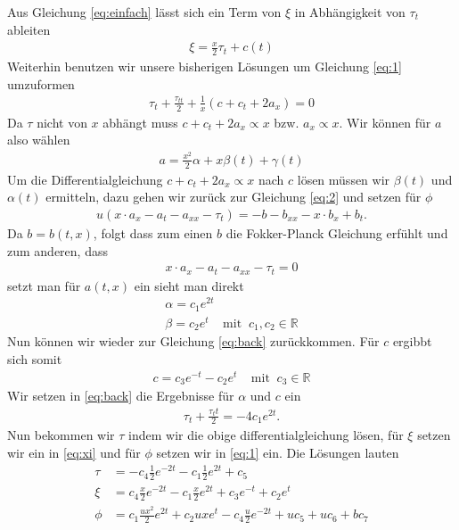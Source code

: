 \documentclass[a4paper]{article}
\begin{document}
Aus Gleichung \ref{eq:einfach} lässt sich ein Term von $\xi$ in Abhängigkeit
von $\tau_t$ ableiten
\begin{align}
    \xi = \frac{x}{2} \tau_t + c(t) \label{eq:xi}
\end{align}
Weiterhin benutzen wir unsere bisherigen Lösungen um Gleichung \ref{eq:1}
umzuformen
\begin{align}
    \tau_t +\frac{\tau_{tt}}{2} + \frac{1}{x}(c +c_t + 2a_x) = 0\label{eq:back}
\end{align}
Da $\tau$ nicht von $x$ abhängt muss $c + c_t + 2a_x \propto x$ bzw. $a_x
\propto x$. Wir können für $a$ also wählen
\begin{align}
    a = \frac{x^2}{2}\alpha+x\beta(t)+\gamma(t)
\end{align}
Um die Differentialgleichung $c+c_t+2a_x \propto x$ nach $c$ lösen müssen wir
$\beta(t)$ und $\alpha(t)$ ermitteln, dazu gehen wir zurück zur Gleichung
\ref{eq:2} und setzen für $\phi$
\begin{align}
    u( x\cdot a_x -  a_t - a_{xx} -\tau_t) = -b -b_{xx}
    -x\cdot b_{x} + b_t.
\end{align}
Da $b = b(t,x)$, folgt dass zum einen $b$ die Fokker-Planck Gleichung erfühlt
und zum anderen, dass
\begin{align}
    x\cdot a_x - a_t -a_{xx} -\tau_t = 0
\end{align}
setzt man für $a(t,x)$ ein sieht man direkt
\begin{align}
    \alpha = c_1 e^{2t}\\
    \beta = c_2 e^t \;\;\;\;\text{mit}\;\;
    c_1, c_2 \in \mathbb{R}
\end{align}
Nun können wir wieder zur Gleichung \ref{eq:back} zurückkommen. Für $c$
ergibbt sich somit
\begin{align}
    c = c_3 e^{-t} - c_2 e^t \;\;\;\;\text{mit}\;\;
    c_3 \in \mathbb{R}
\end{align}
Wir setzen in \ref{eq:back} die Ergebnisse für $\alpha$ und $c$ ein
\begin{align}
    \tau_t + \frac{\tau_tt}{2} = -4 c_1 e^{2t}.
\end{align}
Nun bekommen wir $\tau$ indem wir die obige differentialgleichung lösen, für
$\xi$ setzen wir ein in \ref{eq:xi} und für $\phi$ setzen wir in
\ref{eq:1} ein. Die Lösungen lauten
\begin{align}
    \tau &= -c_4\frac{1}{2} e^{-2t} - c_1\frac{1}{2}e^{2t} + c_5\\
    \xi &= c_4\frac{x}{2} e^{-2t} - c_1\frac{x}{2}e^{2t} + c_3e^{-t}
    +c_2e^t\\
    \phi &= c_1\frac{ux^2}{2} e^{2t} + c_2 uxe^t - c_4\frac{u}{2}e^{-2t}
    +uc_5 + uc_6 + bc_7
\end{align}
\end{document}
